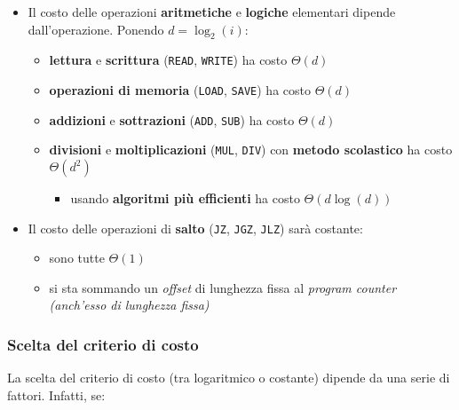 \documentclass[italian, 10pt]{article}
\begin{document}
\begin{minipage}[htbp]{.99\textwidth}
  \bigskip
  \begin{itemize}
    \item Il costo delle operazioni \textbf{aritmetiche} e \textbf{logiche} elementari dipende dall'operazione. Ponendo \(d = \log_2(i)\):
          \begin{itemize}[label=\(\rightarrow\)]
            \item \textbf{lettura} e \textbf{scrittura} (\texttt{READ}, \texttt{WRITE}) ha costo \(\Theta(d)\)
            \item \textbf{operazioni di memoria} (\texttt{LOAD}, \texttt{SAVE}) ha costo \(\Theta(d)\)
            \item \textbf{addizioni} e \textbf{sottrazioni} (\texttt{ADD}, \texttt{SUB}) ha costo \(\Theta(d)\)
            \item \textbf{divisioni} e \textbf{moltiplicazioni} (\texttt{MUL}, \texttt{DIV}) con \textbf{metodo scolastico} ha costo \(\Theta(d^2)\)
                  \begin{itemize}[label=\(\rightarrow\)]
                    \item usando \textbf{algoritmi più efficienti} ha costo \(\Theta\left(d \log{(d)}\right)\)
                  \end{itemize}

          \end{itemize}
    \item Il costo delle operazioni di \textbf{salto} (\texttt{JZ}, \texttt{JGZ}, \texttt{JLZ}) sarà costante:
          \begin{itemize}[label=\(\rightarrow\)]
            \item sono tutte \(\Theta(1)\)
            \item si sta sommando un \textit{offset} di lunghezza fissa al \textit{program counter} \textit{(anch'esso di lunghezza fissa)}
          \end{itemize}
  \end{itemize}
\end{minipage}

\subsubsection{Scelta del criterio di costo}

La scelta del criterio di costo (tra logaritmico o costante) dipende da una serie di fattori.
Infatti, se:
\end{document}
